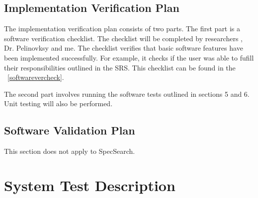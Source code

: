 \documentclass[12pt, titlepage]{article}
\begin{document}
\subsection{Implementation Verification Plan}
\label{ImplementationVerPlan}
The implementation verification plan consists of two parts. The first part 
is a software verification checklist. The checklist will be completed by 
researchers , Dr. Pelinovksy  and me. The 
checklist verifies that basic software features have been implemented 
successfully. 
For example, it checks if the user was able to fufill  their responsibilities 
outlined in the SRS. 
This checklist can be found in the ~\ref{softwarevercheck}.\\ 

 The 
second part involves running the software tests 
outlined in sections 5 and 6. Unit testing will also be performed. 

\subsection{Software Validation Plan}
\label{SoftwareValidationPlan}
This section does not apply to SpecSearch. 

\section{System Test Description}
	
\end{document}
